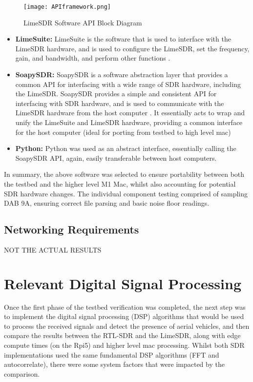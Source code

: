 \begin{figure}[htbp]
    \centering
    \texttt{[image: APIframework.png]}
    \caption{LimeSDR Software API Block Diagram}
    \label{fig:limeSDRapi}
\end{figure}

\begin{itemize}
    \item \textbf{LimeSuite:} LimeSuite is the software that is used to interface with the LimeSDR hardware, and is used to configure the LimeSDR, set the frequency, gain, and bandwidth, and perform other functions \cite{limesdr_usb}. 
    \item \textbf{SoapySDR:} SoapySDR \cite{soapsdr} is a software abstraction layer that provides a common API for interfacing with a wide range of SDR hardware, including the LimeSDR. SoapySDR provides a simple and consistent API for interfacing with SDR hardware, and is used to communicate with the LimeSDR hardware from the host computer \cite{SoapySDR}. It essentially acts to wrap and unify the LimeSuite and LimeSDR hardware, providing a common interface for the host computer (ideal for porting from testbed to high level mac)
    \item \textbf{Python:} Python was used as an abstract interface, essentially calling the SoapySDR API, again, easily transferable between host computers. 
\end{itemize}

In summary, the above software was selected to ensure portability between both the testbed and the higher level M1 Mac, whilst also accounting for potential SDR hardware changes. The individual component testing comprised of sampling DAB 9A, ensuring correct file parsing and basic noise floor readings.

\subsection{Networking Requirements \label{sec:networking}}


 NOT THE ACTUAL RESULTS
\section{Relevant Digital Signal Processing}

Once the first phase of the testbed verification was completed, the next step was to implement the digital signal processing (DSP) algorithms that would be used to process the received signals and detect the presence of aerial vehicles, and then compare the results between the RTL-SDR and the LimeSDR, along with edge compute times (on the Rpi5) and higher level mac processing. Whilst both SDR implementations used the same fundamental DSP algorithms (FFT and autocorrelate), there were some system factors that were impacted by the comparison. 

